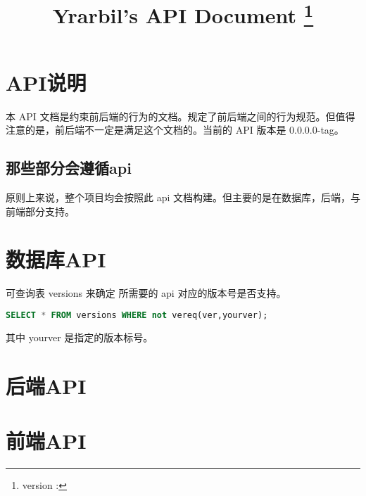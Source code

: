 \documentclass[UTF8]{ctexart}
\title{Yrarbil's API Document \thanks{version : \apiver}}
\def\apiver{0.0.0.0-tag}
\begin{document}
    \maketitle
    \newpage
    
    \tableofcontents
    \newpage
    \section{API说明}
    本 API 文档是约束前后端的行为的文档。规定了前后端之间的行为规范。但值得注意的是，前后端不一定是满足这个文档的。当前的 API 版本是 \apiver 。
    \subsection{那些部分会遵循api}
    原则上来说，整个项目均会按照此 api 文档构建。但主要的是在数据库，后端，与前端部分支持。
    \section{数据库API}
     可查询表 versions 来确定 所需要的 api 对应的版本号是否支持。
    \begin{lstlisting}[language=SQL]
    SELECT * FROM versions WHERE not vereq(ver,yourver);
    \end{lstlisting}
    其中 yourver 是指定的版本标号。
    \section{后端API}
    \section{前端API}
    
\end{document}
